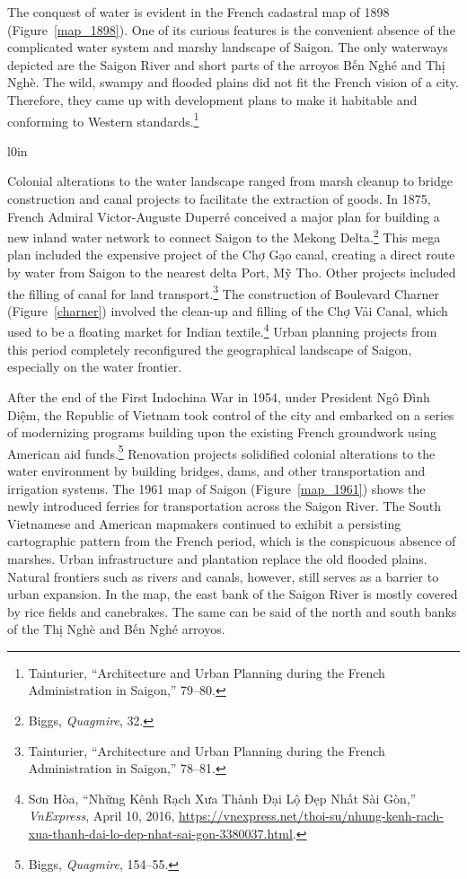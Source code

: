 The conquest of water is evident in the French cadastral map of 1898 (Figure~\ref{map_1898}). One of its curious features is the convenient absence of the complicated water system and marshy landscape of Saigon. The only waterways depicted are the Saigon River and short parts of the arroyos \vi Bến Nghé and Thị Nghè. The wild, swampy and flooded plains did not fit the French vision of a city. Therefore, they came up with development plans to make it habitable and conforming to Western standards.\footnote{Tainturier, “Architecture and Urban Planning during the French Administration in Saigon,” 79–80.}
\en
\begin{wrapfigure}{l}{0in}
\caption[Boulevard Charner]{Boulevard Charner (marked red) (Image cropped from map by M. Bertaux and A. Chauvet.)}
\label{charner}
\vspace{-.2 in}
\end{wrapfigure}
\vi Colonial alterations to the water landscape ranged from marsh cleanup to bridge construction and canal projects to facilitate the extraction of goods. In 1875, French Admiral Victor-Auguste Duperré conceived a major plan for building a new inland water network to connect Saigon to the Mekong Delta.\footnote{Biggs, \textit{Quagmire}, 32.} This mega plan included the expensive project of the Chợ Gạo canal, creating a direct route by water from Saigon to the nearest delta Port, Mỹ Tho. Other projects included the filling of canal for land transport.\footnote{Tainturier, “Architecture and Urban Planning during the French Administration in Saigon,” 78–81.} The construction of Boulevard Charner (Figure~\ref{charner}) involved the clean-up and filling of the Chợ Vải Canal, which used to be a floating market for Indian textile.\footnote{Sơn Hòa, “Những Kênh Rạch Xưa Thành Đại Lộ Đẹp Nhất Sài Gòn,” \textit{VnExpress}, April 10, 2016, \url{https://vnexpress.net/thoi-su/nhung-kenh-rach-xua-thanh-dai-lo-dep-nhat-sai-gon-3380037.html}.} Urban planning projects from this period completely reconfigured the geographical landscape of Saigon, especially on the water frontier.

After the end of the First Indochina War in 1954, under President Ngô Đình Diệm, the Republic of Vietnam took control of the city and embarked on a series of modernizing programs building upon the existing French groundwork using American aid funds.\footnote{Biggs, \textit{Quagmire}, 154–55.} Renovation projects solidified colonial alterations to the water environment by building bridges, dams, and other transportation and irrigation systems. The 1961 map of Saigon (Figure~\ref{map_1961}) shows the newly introduced ferries for transportation across the Saigon River. The South Vietnamese and American mapmakers continued to exhibit a persisting cartographic pattern from the French period, which is the conspicuous absence of marshes. Urban infrastructure and plantation replace the old flooded plains. Natural frontiers such as rivers and canals, however, still serves as a barrier to urban expansion. In the map, the east bank of the Saigon River is mostly covered by rice fields and canebrakes. The same can be said of the north and south banks of the Thị Nghè and Bến Nghé arroyos.

